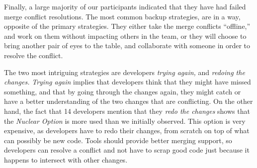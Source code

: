 Finally, a large majority of our participants indicated that they have had failed merge conflict resolutions.
The most common backup strategies, are in a way, opposite of the primary strategies.
They either take the merge conflicts ``offline,'' and work on them without impacting others in the team, or they will choose to bring another pair of eyes to the table, and collaborate with someone in order to resolve the conflict.

The two most intriguing strategies are developers \emph{trying again,} and \emph{redoing the changes.}
\emph{Trying again} implies that developers think that they might have missed something, and that by going through the changes again, they might catch or have a better understanding of the two changes that are conflicting.
On the other hand, the fact that 14 developers mention that they \emph{redo the changes} shows that the \emph{Nuclear Option} is more used than we initially observed.
This option is very expensive, as developers have to redo their changes, from scratch on top of what can possibly be new code.
Tools should provide better merging support, so developers can resolve a conflict and not have to scrap good code just because it happens to intersect with other changes.

